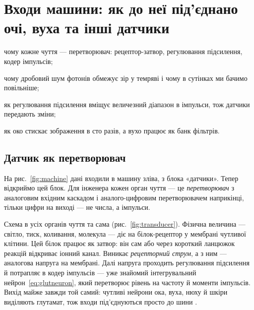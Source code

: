 \chapter{Входи машини: як до неї під'єднано очі, вуха та інші датчики}
\label{sec:sensors}
\begin{chaptergoals}
\item чому кожне чуття --- перетворювач: рецептор-затвор, регулювання підсилення, кодер імпульсів;
\item чому дробовий шум фотонів обмежує зір у темряві і чому в сутінках ми бачимо повільніше;
\item як регулювання підсилення вміщує величезний діапазон в імпульси, тож датчики передають зміни;
\item як око стискає зображення в сто разів, а вухо працює як банк фільтрів.
\end{chaptergoals}

\section{Датчик як перетворювач}

На рис.~\ref{fig:machine} дані входили в машину зліва, з блока «датчики». Тепер відкриймо цей блок. Для інженера кожен орган чуття --- це \emph{перетворювач} з аналоговим вхідним каскадом і аналого-цифровим перетворювачем наприкінці, тільки цифри на виході --- не числа, а імпульси.

Схема в усіх органів чуття та сама (рис.~\ref{fig:transducer}). Фізична величина --- світло, тиск, коливання, молекула --- діє на білок-рецептор у мембрані чутливої клітини. Цей білок працює як затвор: він сам або через короткий ланцюжок реакцій відкриває іонний канал. Виникає \emph{рецепторний струм}, а з ним --- аналогова напруга на мембрані. Далі напруга проходить регулювання підсилення й потрапляє в кодер імпульсів --- уже знайомий інтегрувальний нейрон~\eqref{eq:glutneuron}, який перетворює рівень на частоту й моменти імпульсів. Вихід майже завжди той самий: чутливі нейрони ока, вуха, нюху й шкіри виділяють глутамат, тож входи під'єднуються просто до шини .

